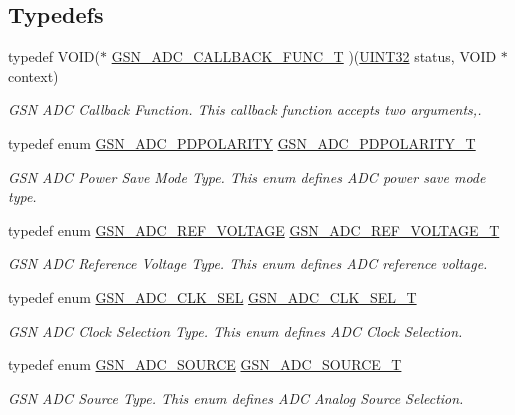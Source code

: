 \subsection*{Typedefs}
\begin{DoxyCompactItemize}
\item 
typedef VOID($\ast$ \hyperlink{a00643_ga988a548c116a5b35c3725a268f74519a}{GSN\_\-ADC\_\-CALLBACK\_\-FUNC\_\-T} )(\hyperlink{a00660_gae1e6edbbc26d6fbc71a90190d0266018}{UINT32} status, VOID $\ast$context)
\begin{DoxyCompactList}\small\item\em GSN ADC Callback Function. This callback function accepts two arguments,. \end{DoxyCompactList}\item 
typedef enum \hyperlink{a00643_ga16deea942d0f1d07a971516149233bb4}{GSN\_\-ADC\_\-PDPOLARITY} \hyperlink{a00643_gadc237f56f621b5000b7ed2b2617ff364}{GSN\_\-ADC\_\-PDPOLARITY\_\-T}
\begin{DoxyCompactList}\small\item\em GSN ADC Power Save Mode Type. This enum defines ADC power save mode type. \end{DoxyCompactList}\item 
typedef enum \hyperlink{a00643_ga8371c67f612ecadda1e42fa07f34a967}{GSN\_\-ADC\_\-REF\_\-VOLTAGE} \hyperlink{a00643_ga560e320e7f3b88d78bb8d8766a8c7445}{GSN\_\-ADC\_\-REF\_\-VOLTAGE\_\-T}
\begin{DoxyCompactList}\small\item\em GSN ADC Reference Voltage Type. This enum defines ADC reference voltage. \end{DoxyCompactList}\item 
typedef enum \hyperlink{a00643_ga2f2a2e534be6515e903852c38803c75f}{GSN\_\-ADC\_\-CLK\_\-SEL} \hyperlink{a00643_ga36798ea9dfbf3935126b374c4dba00dd}{GSN\_\-ADC\_\-CLK\_\-SEL\_\-T}
\begin{DoxyCompactList}\small\item\em GSN ADC Clock Selection Type. This enum defines ADC Clock Selection. \end{DoxyCompactList}\item 
typedef enum \hyperlink{a00643_gad3668c4c0f4514808fad4505e4f42900}{GSN\_\-ADC\_\-SOURCE} \hyperlink{a00643_gab77114095147b118ac43431055973712}{GSN\_\-ADC\_\-SOURCE\_\-T}
\begin{DoxyCompactList}\small\item\em GSN ADC Source Type. This enum defines ADC Analog Source Selection. \end{DoxyCompactList}\item 

\end{DoxyCompactItemize}
